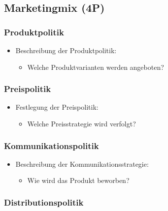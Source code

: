 \subsection{Marketingmix (4P)}\label{marketingmix-4p}

\subsubsection{Produktpolitik}\label{produktpolitik}

\begin{itemize}
\item
  Beschreibung der Produktpolitik:

  \begin{itemize}
  
  \item
    Welche Produktvarianten werden angeboten?
  \end{itemize}
\end{itemize}

\subsubsection{Preispolitik}\label{preispolitik}

\begin{itemize}
\item
  Festlegung der Preispolitik:

  \begin{itemize}
  
  \item
    Welche Preisstrategie wird verfolgt?
  \end{itemize}
\end{itemize}

\subsubsection{Kommunikationspolitik}\label{kommunikationspolitik}

\begin{itemize}
\item
  Beschreibung der Kommunikationsstrategie:

  \begin{itemize}
  
  \item
    Wie wird das Produkt beworben?
  \end{itemize}
\end{itemize}

\subsubsection{Distributionspolitik}\label{distributionspolitik}

